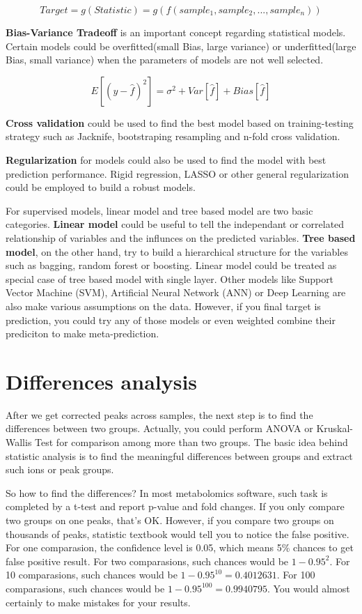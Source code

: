 \documentclass[
]{book}
\begin{document}
\[Target = g(Statistic) = g(f(sample_1,sample_2,...,sample_n))\]

\textbf{Bias-Variance Tradeoff} is an important concept regarding statistical models. Certain models could be overfitted(small Bias, large variance) or underfitted(large Bias, small variance) when the parameters of models are not well selected.

\[E[(y - \hat f)^2] = \sigma^2 + Var[\hat f] + Bias[\hat f]\]

\textbf{Cross validation} could be used to find the best model based on training-testing strategy such as Jacknife, bootstraping resampling and n-fold cross validation.

\textbf{Regularization} for models could also be used to find the model with best prediction performance. Rigid regression, LASSO or other general regularization could be employed to build a robust models.

For supervised models, linear model and tree based model are two basic categories. \textbf{Linear model} could be useful to tell the independant or correlated relationship of variables and the influnces on the predicted variables. \textbf{Tree based model}, on the other hand, try to build a hierarchical structure for the variables such as bagging, random forest or boosting. Linear model could be treated as special case of tree based model with single layer. Other models like Support Vector Machine (SVM), Artificial Neural Network (ANN) or Deep Learning are also make various assumptions on the data. However, if you final target is prediction, you could try any of those models or even weighted combine their prediciton to make meta-prediction.

\hypertarget{differences-analysis}{%
\section{Differences analysis}\label{differences-analysis}}

After we get corrected peaks across samples, the next step is to find the differences between two groups. Actually, you could perform ANOVA or Kruskal-Wallis Test for comparison among more than two groups. The basic idea behind statistic analysis is to find the meaningful differences between groups and extract such ions or peak groups.

So how to find the differences? In most metabolomics software, such task is completed by a t-test and report p-value and fold changes. If you only compare two groups on one peaks, that's OK. However, if you compare two groups on thousands of peaks, statistic textbook would tell you to notice the false positive. For one comparasion, the confidence level is 0.05, which means 5\% chances to get false positive result. For two comparasions, such chances would be \(1-0.95^2\). For 10 comparasions, such chances would be \(1-0.95^{10} = 0.4012631\). For 100 comparasions, such chances would be \(1-0.95^{100} = 0.9940795\). You would almost certainly to make mistakes for your results.
\end{document}
